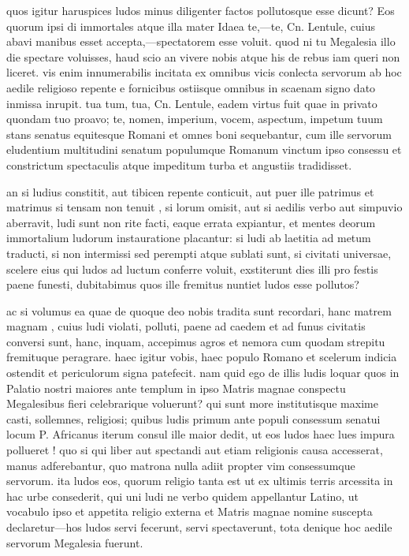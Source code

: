  quos igitur haruspices ludos minus diligenter factos pollutosque esse dicunt? Eos quorum ipsi di immortales atque illa mater Idaea te,—te, Cn. Lentule, cuius abavi manibus esset accepta,—spectatorem esse voluit. quod ni tu Megalesia illo die spectare voluisses, haud scio an vivere nobis atque his de rebus iam queri non liceret. vis enim innumerabilis incitata ex omnibus vicis conlecta servorum ab hoc aedile religioso repente e fornicibus ostiisque omnibus in scaenam signo dato inmissa inrupit. tua tum, tua, Cn. Lentule, eadem virtus fuit quae in privato quondam tuo proavo; te, nomen, imperium, vocem, aspectum, impetum tuum stans senatus equitesque Romani et omnes boni sequebantur, cum ille servorum eludentium multitudini senatum populumque Romanum vinctum ipso consessu et constrictum spectaculis atque impeditum turba et angustiis tradidisset.

 an si ludius constitit, aut tibicen repente conticuit, aut puer ille patrimus et matrimus si tensam non tenuit , si lorum omisit, aut si aedilis verbo aut simpuvio aberravit, ludi sunt non rite facti, eaque errata expiantur, et mentes deorum immortalium ludorum instauratione placantur: si ludi ab laetitia ad metum traducti, si non intermissi sed perempti atque sublati sunt, si civitati universae, scelere eius qui ludos ad luctum conferre voluit, exstiterunt dies illi pro festis paene funesti, dubitabimus quos ille fremitus nuntiet ludos esse pollutos?

 ac si volumus ea quae de quoque deo nobis tradita sunt recordari, hanc matrem magnam , cuius ludi violati, polluti, paene ad caedem et ad funus civitatis conversi sunt, hanc, inquam, accepimus agros et nemora cum quodam strepitu fremituque peragrare. haec igitur vobis, haec populo Romano et scelerum indicia ostendit et periculorum signa patefecit. nam quid ego de illis ludis loquar quos in Palatio nostri maiores ante templum in ipso Matris magnae conspectu Megalesibus fieri celebrarique voluerunt? qui sunt more institutisque maxime casti, sollemnes, religiosi; quibus ludis primum ante populi consessum senatui locum P. Africanus iterum consul ille maior dedit, ut eos ludos haec lues impura pollueret ! quo si qui liber aut spectandi aut etiam religionis causa accesserat, manus adferebantur, quo matrona nulla adiit propter vim consessumque servorum. ita ludos eos, quorum religio tanta est ut ex ultimis terris arcessita in hac urbe consederit, qui uni ludi ne verbo quidem appellantur Latino, ut vocabulo ipso et appetita religio externa et Matris magnae nomine suscepta declaretur—hos ludos servi fecerunt, servi spectaverunt, tota denique hoc aedile servorum Megalesia fuerunt.

